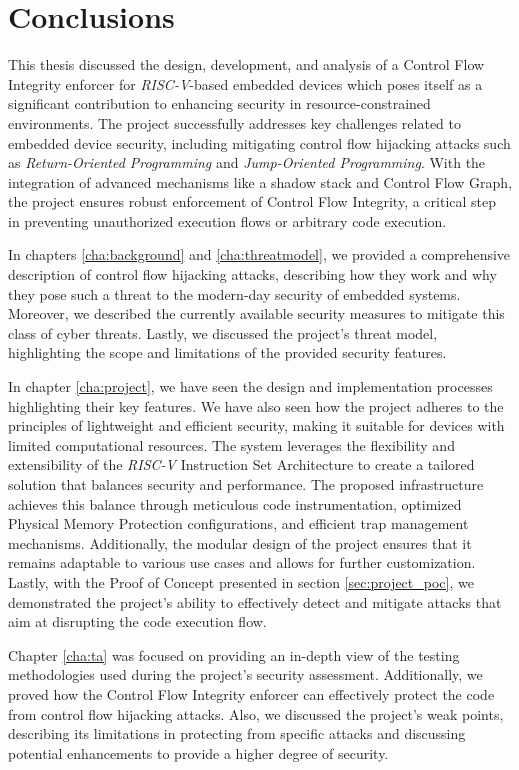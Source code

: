 \chapter{Conclusions}
\label{cha:conclusions}

This thesis discussed the design, development, and analysis of a Control Flow
Integrity enforcer for \textit{RISC-V}-based embedded devices which poses itself
as a significant contribution to enhancing security in resource-constrained environments.
The project successfully addresses key challenges related to embedded device
security, including mitigating control flow hijacking attacks such as \textit{Return-Oriented
Programming} and \textit{Jump-Oriented Programming}. With the integration of
advanced mechanisms like a shadow stack and Control Flow Graph, the project ensures
robust enforcement of Control Flow Integrity, a critical step in preventing
unauthorized execution flows or arbitrary code execution.

In chapters \ref{cha:background} and \ref{cha:threatmodel}, we provided a comprehensive
description of control flow hijacking attacks, describing how they work and why
they pose such a threat to the modern-day security of embedded systems. Moreover,
we described the currently available security measures to mitigate this class of
cyber threats. Lastly, we discussed the project's threat model, highlighting the
scope and limitations of the provided security features.

In chapter \ref{cha:project}, we have seen the design and implementation
processes highlighting their key features. We have also seen how the project adheres
to the principles of lightweight and efficient security, making it suitable for
devices with limited computational resources. The system leverages the flexibility
and extensibility of the \textit{RISC-V} Instruction Set Architecture to create
a tailored solution that balances security and performance. The proposed infrastructure
achieves this balance through meticulous code instrumentation, optimized
Physical Memory Protection configurations, and efficient trap management mechanisms.
Additionally, the modular design of the project ensures that it remains adaptable
to various use cases and allows for further customization. Lastly, with the Proof
of Concept presented in section \ref{sec:project_poc}, we demonstrated the
project's ability to effectively detect and mitigate attacks that aim at
disrupting the code execution flow.

Chapter \ref{cha:ta} was focused on providing an in-depth view of the testing
methodologies used during the project's security assessment. Additionally, we
proved how the Control Flow Integrity enforcer can effectively protect the code
from control flow hijacking attacks. Also, we discussed the project's weak
points, describing its limitations in protecting from specific attacks and discussing
potential enhancements to provide a higher degree of security.


